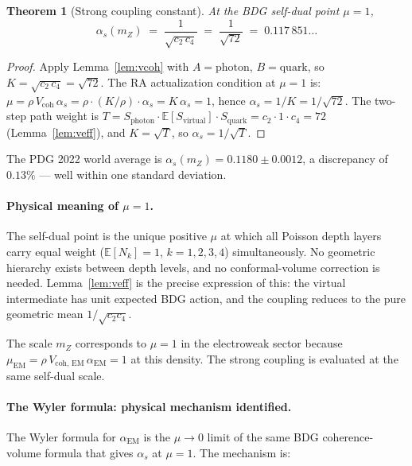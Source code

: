 \documentclass[11pt,a4paper]{article}
\newtheorem{theorem}{Theorem}[section]
\begin{document}
\begin{theorem}[Strong coupling constant]
\label{thm:alpha_s}
At the BDG self-dual point $\mu = 1$,
\begin{equation}
  \alpha_s(m_Z) \;=\; \frac{1}{\sqrt{c_2\,c_4}}
  \;=\; \frac{1}{\sqrt{72}} \;=\; 0.117\,851\ldots
  \label{eq:alpha_s_proved}
\end{equation}
\end{theorem}
\begin{proof}
Apply Lemma~\ref{lem:vcoh} with $A = \text{photon}$, $B = \text{quark}$,
so $K = \sqrt{c_2\,c_4} = \sqrt{72}$.  The RA actualization condition at
$\mu = 1$ is:
$\mu = \rho\,V_{\mathrm{coh}}\,\alpha_s = \rho\cdot(K/\rho)\cdot\alpha_s = K\,\alpha_s = 1$,
hence $\alpha_s = 1/K = 1/\sqrt{72}$.
The two-step path weight is
$T = S_{\text{photon}}\cdot\mathbb{E}[S_{\text{virtual}}]\cdot S_{\text{quark}}
= c_2 \cdot 1 \cdot c_4 = 72$ (Lemma~\ref{lem:veff}), and
$K = \sqrt{T}$, so $\alpha_s = 1/\sqrt{T}$.
\end{proof}

\noindent
The PDG 2022 world average is $\alpha_s(m_Z) = 0.1180 \pm 0.0012$,
a discrepancy of $0.13\%$ --- well within one standard deviation.

\paragraph{Physical meaning of $\mu=1$.}
The self-dual point is the unique positive $\mu$ at which all Poisson depth
layers carry equal weight ($\mathbb{E}[N_k] = 1$, $k=1,2,3,4$) simultaneously.
No geometric hierarchy exists between depth levels, and no conformal-volume
correction is needed.  Lemma~\ref{lem:veff} is the precise expression of this:
the virtual intermediate has unit expected BDG action, and the coupling reduces
to the pure geometric mean $1/\sqrt{c_2 c_4}$.

The scale $m_Z$ corresponds to $\mu=1$ in the electroweak sector because
$\mu_{\mathrm{EM}} = \rho\,V_{\mathrm{coh},\,\mathrm{EM}}\,\alpha_{\mathrm{EM}} = 1$
at this density.  The strong coupling is evaluated at the same self-dual
scale.

\paragraph{The Wyler formula: physical mechanism identified.}
The Wyler formula for $\alpha_{\mathrm{EM}}$ is the $\mu\to 0$ limit of
the same BDG coherence-volume formula that gives $\alpha_s$ at $\mu=1$.
The mechanism is:
\end{document}
